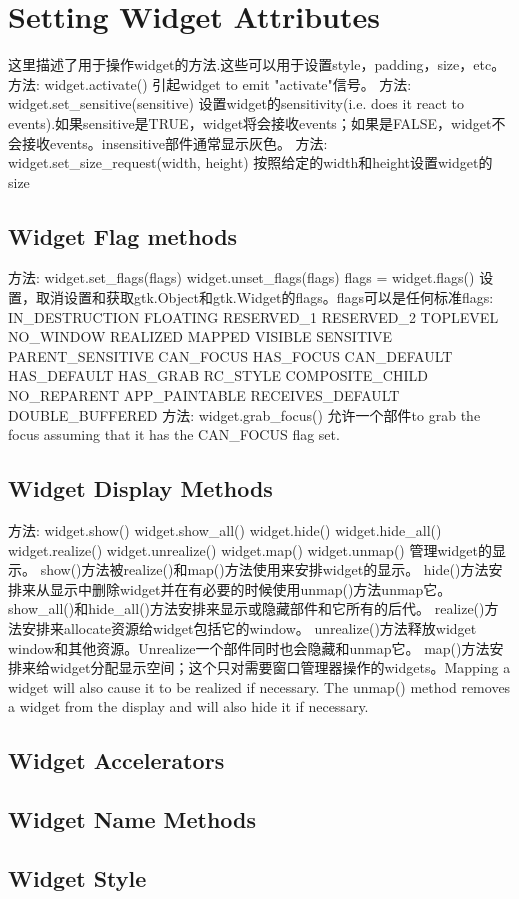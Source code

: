 \chapter{Setting Widget Attributes}
这里描述了用于操作widget的方法.这些可以用于设置style，padding，size，etc。
方法:
widget.activate()
引起widget to emit "activate"信号。
方法:
widget.set_sensitive(sensitive)
设置widget的sensitivity(i.e. does it react to events).如果sensitive是TRUE，widget将会接收events；如果是FALSE，widget不会接收events。insensitive部件通常显示灰色。
方法:
widget.set_size_request(width, height)
按照给定的width和height设置widget的size
\section{Widget Flag methods}
方法:
widget.set_flags(flags)
widget.unset_flags(flags)
flags = widget.flags()
设置，取消设置和获取gtk.Object和gtk.Widget的flags。flags可以是任何标准flags:
IN_DESTRUCTION
FLOATING
RESERVED_1
RESERVED_2
TOPLEVEL
NO_WINDOW
REALIZED
MAPPED
VISIBLE
SENSITIVE
PARENT_SENSITIVE
CAN_FOCUS
HAS_FOCUS
CAN_DEFAULT
HAS_DEFAULT
HAS_GRAB
RC_STYLE
COMPOSITE_CHILD
NO_REPARENT
APP_PAINTABLE
RECEIVES_DEFAULT
DOUBLE_BUFFERED
方法:
widget.grab_focus()
允许一个部件to grab the focus assuming that it has the CAN_FOCUS flag set.
\section{Widget Display Methods}
方法:
widget.show()
widget.show_all()
widget.hide()
widget.hide_all()
widget.realize()
widget.unrealize()
widget.map()
widget.unmap()
管理widget的显示。
show()方法被realize()和map()方法使用来安排widget的显示。
hide()方法安排来从显示中删除widget并在有必要的时候使用unmap()方法unmap它。
show_all()和hide_all()方法安排来显示或隐藏部件和它所有的后代。
realize()方法安排来allocate资源给widget包括它的window。
unrealize()方法释放widget window和其他资源。Unrealize一个部件同时也会隐藏和unmap它。
map()方法安排来给widget分配显示空间；这个只对需要窗口管理器操作的widgets。Mapping a widget will also cause it to be realized if necessary.
The unmap() method removes a widget from the display and will also hide it if necessary.

\section{Widget Accelerators}
\section{Widget Name Methods}
\section{Widget Style}
